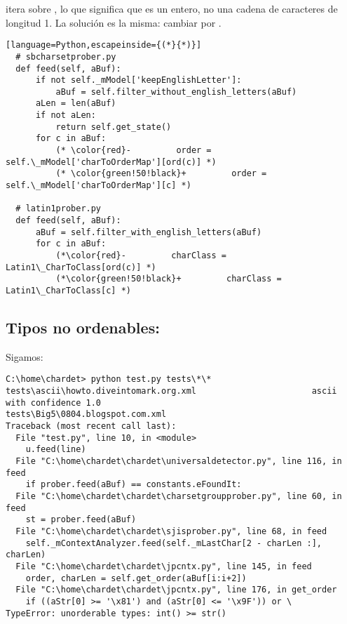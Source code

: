  itera sobre , lo que significa que es un entero, no una cadena de caracteres de longitud 1. La solución es la misma: cambiar  por .


\begin{lstlisting}[language=Python,escapeinside={(*}{*)}]
  # sbcharsetprober.py
  def feed(self, aBuf):
      if not self._mModel['keepEnglishLetter']:
          aBuf = self.filter_without_english_letters(aBuf)
      aLen = len(aBuf)
      if not aLen:
          return self.get_state()
      for c in aBuf:
          (* \color{red}-         order = self.\_mModel['charToOrderMap'][ord(c)] *)
          (* \color{green!50!black}+         order = self.\_mModel['charToOrderMap'][c] *)

  # latin1prober.py
  def feed(self, aBuf):
      aBuf = self.filter_with_english_letters(aBuf)
      for c in aBuf:
          (*\color{red}-         charClass = Latin1\_CharToClass[ord(c)] *)
          (*\color{green!50!black}+         charClass = Latin1\_CharToClass[c] *)
\end{lstlisting}

\subsection{Tipos no ordenables: }

Sigamos:

\noindent\begin{minipage}{\textwidth}
\begin{lstlisting}[breaklines=true]
C:\home\chardet> python test.py tests\*\*
tests\ascii\howto.diveintomark.org.xml                       ascii with confidence 1.0
tests\Big5\0804.blogspot.com.xml
Traceback (most recent call last):
  File "test.py", line 10, in <module>
    u.feed(line)
  File "C:\home\chardet\chardet\universaldetector.py", line 116, in feed
    if prober.feed(aBuf) == constants.eFoundIt:
  File "C:\home\chardet\chardet\charsetgroupprober.py", line 60, in feed
    st = prober.feed(aBuf)
  File "C:\home\chardet\chardet\sjisprober.py", line 68, in feed
    self._mContextAnalyzer.feed(self._mLastChar[2 - charLen :], charLen)
  File "C:\home\chardet\chardet\jpcntx.py", line 145, in feed
    order, charLen = self.get_order(aBuf[i:i+2])
  File "C:\home\chardet\chardet\jpcntx.py", line 176, in get_order
    if ((aStr[0] >= '\x81') and (aStr[0] <= '\x9F')) or \
TypeError: unorderable types: int() >= str()
\end{lstlisting}
\end{minipage}

